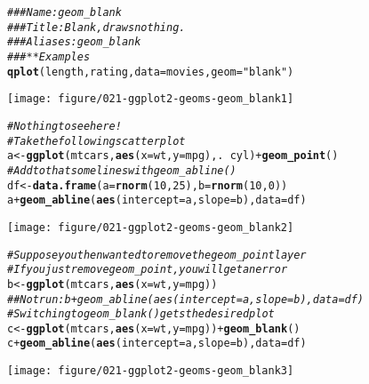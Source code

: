 \documentclass[a4paper,titlepage]{tufte-handout}\usepackage[]{graphicx}\usepackage[]{color}
\makeatletter
\def\maxwidth{ %
  \ifdim\Gin@nat@width>\linewidth
    \linewidth
  \else
    \Gin@nat@width
  \fi
}
\newcommand{\hlnum}[1]{\textcolor[rgb]{0.686,0.059,0.569}{#1}}%
\newcommand{\hlstr}[1]{\textcolor[rgb]{0.192,0.494,0.8}{#1}}%
\newcommand{\hlcom}[1]{\textcolor[rgb]{0.678,0.584,0.686}{\textit{#1}}}%
\newcommand{\hlopt}[1]{\textcolor[rgb]{0,0,0}{#1}}%
\newcommand{\hlstd}[1]{\textcolor[rgb]{0.345,0.345,0.345}{#1}}%
\newcommand{\hlkwb}[1]{\textcolor[rgb]{0.69,0.353,0.396}{#1}}%
\newcommand{\hlkwc}[1]{\textcolor[rgb]{0.333,0.667,0.333}{#1}}%
\newcommand{\hlkwd}[1]{\textcolor[rgb]{0.737,0.353,0.396}{\textbf{#1}}}%
\newenvironment{kframe}{%
 \def\at@end@of@kframe{}%
 \ifinner\ifhmode%
  \def\at@end@of@kframe{\end{minipage}}%
  \begin{minipage}{\columnwidth}%
 \fi\fi%
 \def\FrameCommand##1{\hskip\@totalleftmargin \hskip-\fboxsep
 \colorbox{shadecolor}{##1}\hskip-\fboxsep
     \hskip-\linewidth \hskip-\@totalleftmargin \hskip\columnwidth}%
 \MakeFramed {\advance\hsize-\width
   \@totalleftmargin\z@ \linewidth\hsize
   \@setminipage}}%
 {\par\unskip\endMakeFramed%
 \at@end@of@kframe}
\newenvironment{knitrout}{}{} %
\makeatother
\begin{document}
\begin{knitrout}
\color{fgcolor}\begin{kframe}
\begin{alltt}
\hlcom{### Name: geom_blank}
\hlcom{### Title: Blank, draws nothing.}
\hlcom{### Aliases: geom_blank}
\hlcom{### ** Examples}
\hlkwd{qplot}\hlstd{(length, rating,} \hlkwc{data} \hlstd{= movies,} \hlkwc{geom} \hlstd{=} \hlstr{"blank"}\hlstd{)}
\end{alltt}
\end{kframe}
\texttt{[image: figure/021-ggplot2-geoms-geom\_blank1]} 
\begin{kframe}\begin{alltt}
\hlcom{# Nothing to see here!}
\hlcom{# Take the following scatter plot}
\hlstd{a} \hlkwb{<-} \hlkwd{ggplot}\hlstd{(mtcars,} \hlkwd{aes}\hlstd{(}\hlkwc{x} \hlstd{= wt,} \hlkwc{y} \hlstd{= mpg), .} \hlopt{~} \hlstd{cyl)} \hlopt{+} \hlkwd{geom_point}\hlstd{()}
\hlcom{# Add to that some lines with geom_abline()}
\hlstd{df} \hlkwb{<-} \hlkwd{data.frame}\hlstd{(}\hlkwc{a} \hlstd{=} \hlkwd{rnorm}\hlstd{(}\hlnum{10}\hlstd{,} \hlnum{25}\hlstd{),} \hlkwc{b} \hlstd{=} \hlkwd{rnorm}\hlstd{(}\hlnum{10}\hlstd{,} \hlnum{0}\hlstd{))}
\hlstd{a} \hlopt{+} \hlkwd{geom_abline}\hlstd{(}\hlkwd{aes}\hlstd{(}\hlkwc{intercept} \hlstd{= a,} \hlkwc{slope} \hlstd{= b),} \hlkwc{data} \hlstd{= df)}
\end{alltt}
\end{kframe}
\texttt{[image: figure/021-ggplot2-geoms-geom\_blank2]} 
\begin{kframe}\begin{alltt}
\hlcom{# Suppose you then wanted to remove the geom_point layer}
\hlcom{# If you just remove geom_point, you will get an error}
\hlstd{b} \hlkwb{<-} \hlkwd{ggplot}\hlstd{(mtcars,} \hlkwd{aes}\hlstd{(}\hlkwc{x} \hlstd{= wt,} \hlkwc{y} \hlstd{= mpg))}
\hlcom{## Not run: b + geom_abline(aes(intercept = a, slope = b), data = df)}
\hlcom{# Switching to geom_blank() gets the desired plot}
\hlstd{c} \hlkwb{<-} \hlkwd{ggplot}\hlstd{(mtcars,} \hlkwd{aes}\hlstd{(}\hlkwc{x} \hlstd{= wt,} \hlkwc{y} \hlstd{= mpg))} \hlopt{+} \hlkwd{geom_blank}\hlstd{()}
\hlstd{c} \hlopt{+} \hlkwd{geom_abline}\hlstd{(}\hlkwd{aes}\hlstd{(}\hlkwc{intercept} \hlstd{= a,} \hlkwc{slope} \hlstd{= b),} \hlkwc{data} \hlstd{= df)}
\end{alltt}
\end{kframe}
\texttt{[image: figure/021-ggplot2-geoms-geom\_blank3]} 
\begin{kframe}\begin{alltt}


\end{alltt}
\end{kframe}
\end{knitrout}
\end{document}
